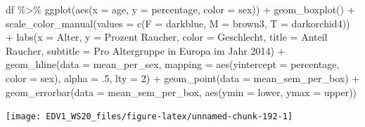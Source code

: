 \documentclass[
]{book}
\newenvironment{Shaded}{\begin{snugshade}}{\end{snugshade}}
\newcommand{\AttributeTok}[1]{\textcolor[rgb]{0.77,0.63,0.00}{#1}}
\newcommand{\DecValTok}[1]{\textcolor[rgb]{0.00,0.00,0.81}{#1}}
\newcommand{\FunctionTok}[1]{\textcolor[rgb]{0.00,0.00,0.00}{#1}}
\newcommand{\NormalTok}[1]{#1}
\newcommand{\SpecialCharTok}[1]{\textcolor[rgb]{0.00,0.00,0.00}{#1}}
\newcommand{\StringTok}[1]{\textcolor[rgb]{0.31,0.60,0.02}{#1}}
\begin{document}
\begin{Shaded}
\begin{Highlighting}[]
\NormalTok{df }\SpecialCharTok{\%\textgreater{}\%} 
  \FunctionTok{ggplot}\NormalTok{(}\FunctionTok{aes}\NormalTok{(}\AttributeTok{x =}\NormalTok{ age,}
             \AttributeTok{y =}\NormalTok{ percentage,}
             \AttributeTok{color =}\NormalTok{ sex)) }\SpecialCharTok{+}
  \FunctionTok{geom\_boxplot}\NormalTok{() }\SpecialCharTok{+}
  \FunctionTok{scale\_color\_manual}\NormalTok{(}\AttributeTok{values =} \FunctionTok{c}\NormalTok{(}\AttributeTok{F =} \StringTok{\textquotesingle{}darkblue\textquotesingle{}}\NormalTok{,}
                               \AttributeTok{M =} \StringTok{\textquotesingle{}brown3\textquotesingle{}}\NormalTok{,}
                               \AttributeTok{T =} \StringTok{\textquotesingle{}darkorchid4\textquotesingle{}}\NormalTok{)) }\SpecialCharTok{+}
  \FunctionTok{labs}\NormalTok{(}\AttributeTok{x =} \StringTok{\textquotesingle{}Alter\textquotesingle{}}\NormalTok{,}
       \AttributeTok{y =} \StringTok{\textquotesingle{}Prozent Raucher\textquotesingle{}}\NormalTok{,}
       \AttributeTok{color =} \StringTok{\textquotesingle{}Geschlecht\textquotesingle{}}\NormalTok{,}
       \AttributeTok{title =} \StringTok{\textquotesingle{}Anteil Raucher\textquotesingle{}}\NormalTok{,}
       \AttributeTok{subtitle =} \StringTok{\textquotesingle{}Pro Altergruppe in Europa im Jahr 2014\textquotesingle{}}\NormalTok{) }\SpecialCharTok{+}
  \FunctionTok{geom\_hline}\NormalTok{(}\AttributeTok{data =}\NormalTok{ mean\_per\_sex,}
             \AttributeTok{mapping =} \FunctionTok{aes}\NormalTok{(}\AttributeTok{yintercept =}\NormalTok{ percentage,}
                           \AttributeTok{color =}\NormalTok{ sex),}
             \AttributeTok{alpha =}\NormalTok{ .}\DecValTok{5}\NormalTok{,}
             \AttributeTok{lty =} \DecValTok{2}\NormalTok{) }\SpecialCharTok{+}
  \FunctionTok{geom\_point}\NormalTok{(}\AttributeTok{data =}\NormalTok{ mean\_sem\_per\_box) }\SpecialCharTok{+}
  \FunctionTok{geom\_errorbar}\NormalTok{(}\AttributeTok{data =}\NormalTok{ mean\_sem\_per\_box,}
                \FunctionTok{aes}\NormalTok{(}\AttributeTok{ymin =}\NormalTok{ lower,}
                    \AttributeTok{ymax =}\NormalTok{ upper))}
\end{Highlighting}
\end{Shaded}

\begin{center}\texttt{[image: EDV1\_WS20\_files/figure-latex/unnamed-chunk-192-1]} \end{center}
\end{document}
